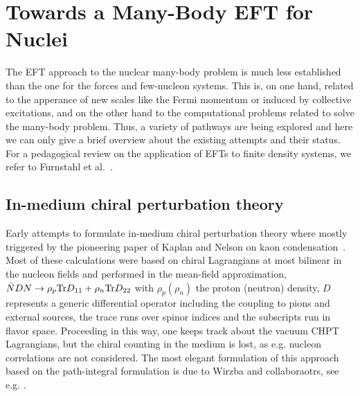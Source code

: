 \documentclass[aps,rmp,nofootinbib,twocolumn,floatfix]{revtex4}
\begin{document}
\section{Towards a Many-Body EFT for Nuclei}
\def\theequation{\arabic{section}.\arabic{equation}}
\setcounter{equation}{0}
\label{sec:many}

The EFT approach to the nuclear many-body problem is much
less established than the one for the forces and few-nucleon
systems. This is, on one hand, related to the apperance of
new scales like the Fermi momentum or induced by collective excitations,
and on the other hand to the computational problems related to 
solve the many-body problem. Thus, a variety of pathways are being
explored and here we can only give a brief overview about the
existing attempts and their status. For a pedagogical
review on the application of EFTs to finite density systems,
we refer to Furnstahl et al.~\cite{Furnstahl:2008df}.

\subsection{In-medium chiral perturbation theory}
\label{sec:CHPTrho}

Early attempts to formulate in-medium chiral perturbation theory 
where mostly triggered by the pioneering paper of Kaplan and
Nelson on kaon condensation~\cite{Nelson:1987dg}. Most of these
calculations were based on chiral Lagrangians at most 
bilinear in the nucleon fields and performed in the mean-field
approximation, $\bar N D N \to \rho_p {\rm Tr} D_{11} +
\rho_n {\rm Tr} D_{22}$ with $\rho_p (\rho_n)$ the proton 
(neutron) density, $D$ represents a generic differential operator
including the coupling to pions and external sources, the
trace runs over spinor indices and the subscripts run in
flavor space. Proceeding in this way, one keeps track
about the vacuum CHPT Lagrangians, but the chiral counting
in the medium is lost, as e.g. nucleon correlations are not
considered. The most elegant formulation of this approach 
based on the path-integral formulation is due to
Wirzba and collaboraotrs, see e.g.   
\cite{Thorsson:1995rj,Kirchbach:1996xy,Kirchbach:1997rk}.
\end{document}
